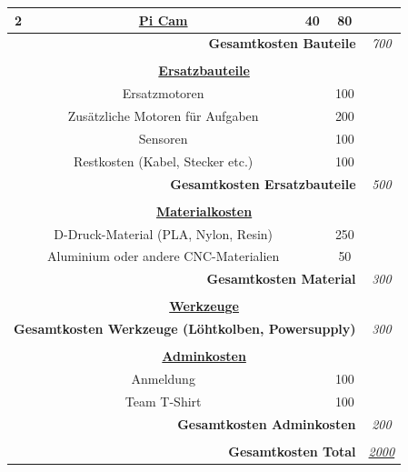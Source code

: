 \documentclass[11pt]{article}
\begin{document}
\begin{tabular}{|c|c|c|c|c|}
        2 & \href{https://www.pi-shop.ch/raspberry-pi-camera-3-wide}{Pi Cam} & 40 & 80 & \\
        \hline
        \multicolumn{4}{|r|}{\textbf{Gesamtkosten Bauteile}} & \textit{700} \\
        \hline
        \multicolumn{5}{|r|}{\textbf{}}  \\
        \multicolumn{5}{|c|}{\textbf{\underline{Ersatzbauteile}}}  \\
        \hline
        & Ersatzmotoren                                                                                                 &    & 100 & \\
        & Zusätzliche Motoren für Aufgaben                                                                         &    & 200 & \\
        & Sensoren & & 100 & \\
        & Restkosten (Kabel, Stecker etc.) & & 100 & \\
        \hline
        \multicolumn{4}{|r|}{\textbf{Gesamtkosten Ersatzbauteile}} & \textit{500} \\
        \hline
        \multicolumn{5}{|r|}{\textbf{}}  \\
        \multicolumn{5}{|c|}{\textbf{\underline{Materialkosten}}}  \\
        \hline
        & D-Druck-Material (PLA, Nylon, Resin) & & 250 & \\
        & Aluminium oder andere CNC-Materialien & & 50 & \\
        \hline
        \multicolumn{4}{|r|}{\textbf{Gesamtkosten Material}} & \textit{300} \\
        \hline
        \multicolumn{5}{|r|}{\textbf{}} \\
        \multicolumn{5}{|c|}{\textbf{\underline{Werkzeuge}}} \\
        \hline
        \multicolumn{4}{|r|}{\textbf{Gesamtkosten Werkzeuge (Löhtkolben, Powersupply)}} & \textit{300} \\
        \hline
        \multicolumn{5}{|r|}{\textbf{}}  \\
        \multicolumn{5}{|c|}{\textbf{\underline{Adminkosten}}}  \\
        \hline
        & Anmeldung & & 100 & \\
        & Team T-Shirt & & 100 & \\
        \hline
        \multicolumn{4}{|r|}{\textbf{Gesamtkosten Adminkosten}} & \textit{200} \\
        \hline
        \multicolumn{5}{|r|}{\textbf{}} \\
        \hline
        \multicolumn{4}{|r|}{\textbf{Gesamtkosten Total}} & \textit{\underline{2000}} \\
        \hline
    \end{tabular}
\end{document}
